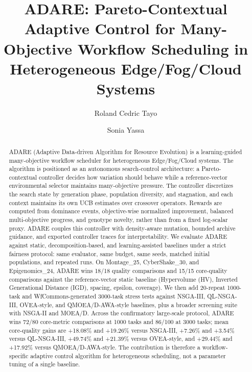 \documentclass[runningheads]{llncs}
\title{ADARE: Pareto-Contextual Adaptive Control for Many-Objective Workflow Scheduling in Heterogeneous Edge/Fog/Cloud Systems}
\author{Roland Cedric Tayo \and Sonia Yassa}
\institute{CY Cergy Paris University, France \\
\email{rolandcedric.tayo@yahoo.fr, sonia.yassa@cyu.fr}}
\begin{document}
\maketitle

\begin{abstract}
\begin{sloppypar}
ADARE (Adaptive Data-driven Algorithm for Resource Evolution) is a learning-guided many-objective workflow scheduler for heterogeneous Edge/Fog/Cloud systems. The algorithm is positioned as an autonomous search-control architecture: a Pareto-contextual controller decides how variation should behave while a reference-vector environmental selector maintains many-objective pressure. The controller discretizes the search state by generation phase, population diversity, and stagnation, and each context maintains its own UCB estimates over crossover operators. Rewards are computed from dominance events, objective-wise normalized improvement, balanced multi-objective progress, and genotype novelty, rather than from a fixed log-scalar proxy. ADARE couples this controller with density-aware mutation, bounded archive guidance, and exported controller traces for interpretability. We evaluate ADARE against static, decomposition-based, and learning-assisted baselines under a strict fairness protocol: same evaluator, same budget, same seeds, matched initial populations, and repeated runs. On Montage\_25, CyberShake\_30, and Epigenomics\_24, ADARE wins 18/18 quality comparisons and 15/15 core-quality comparisons against the reference-vector static baseline (Hypervolume (HV), Inverted Generational Distance (IGD), spacing, epsilon, coverage). We then add 20-repeat 1000-task and WfCommons-generated 3000-task stress tests against NSGA-III, QL-NSGA-III, OVEA-style, and QMOEA/D-AWA-style baselines, plus a broader screening suite with NSGA-II and MOEA/D. Across the confirmatory large-scale protocol, ADARE wins 72/80 core-metric comparisons at 1000 tasks and 86/100 at 3000 tasks; mean core-quality gains are +18.08\% and +19.26\% versus NSGA-III, +7.26\% and +3.54\% versus QL-NSGA-III, +49.74\% and +21.39\% versus OVEA-style, and +29.44\% and +17.92\% versus QMOEA/D-AWA-style. The contribution is therefore a workflow-specific adaptive control algorithm for heterogeneous scheduling, not a parameter tuning of a single baseline.
\end{sloppypar}
\end{abstract}
\end{document}
